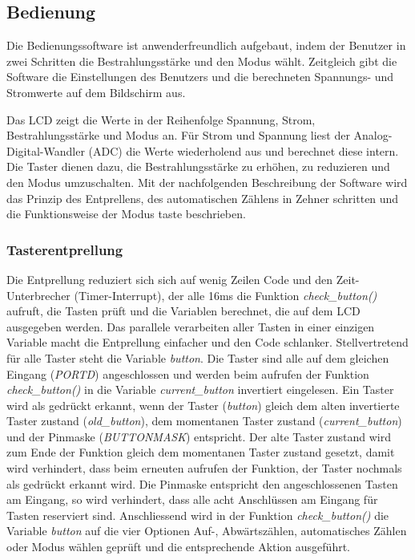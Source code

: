 \subsection{Bedienung}
Die Bedienungssoftware ist anwenderfreundlich aufgebaut, indem der Benutzer in zwei Schritten die Bestrahlungsstärke und den Modus wählt. Zeitgleich gibt die Software die Einstellungen des Benutzers und die berechneten Spannungs- und Stromwerte auf dem Bildschirm aus.

Das LCD zeigt die Werte in der Reihenfolge Spannung, Strom, Bestrahlungsstärke und Modus an. Für Strom und Spannung liest der Analog-Digital-Wandler (ADC) die Werte wiederholend aus und berechnet diese intern. Die Taster dienen dazu, die Bestrahlungsstärke zu erhöhen, zu reduzieren und den Modus umzuschalten. Mit der nachfolgenden Beschreibung der Software wird das Prinzip des Entprellens, des automatischen Zählens in Zehner schritten und die Funktionsweise der Modus taste beschrieben.

\subsubsection{Tasterentprellung}
Die Entprellung reduziert sich sich auf wenig Zeilen Code und den Zeit-Unterbrecher (Timer-Interrupt), der alle 16ms die Funktion \textit{check\_button()} aufruft, die Tasten prüft und die Variablen berechnet, die auf dem LCD ausgegeben werden. Das parallele verarbeiten aller Tasten in einer einzigen Variable macht die Entprellung einfacher und den Code schlanker. Stellvertretend für alle Taster steht die Variable \textit{button}. Die Taster sind alle auf dem gleichen Eingang (\textit{PORTD}) angeschlossen und werden beim aufrufen der Funktion \textit{check\_button()} in die Variable \textit{current\_button} invertiert eingelesen. Ein Taster wird als gedrückt erkannt, wenn der Taster (\textit{button}) gleich dem alten invertierte Taster zustand (\textit{old\_button}), dem momentanen Taster zustand (\textit{current\_button}) und der Pinmaske (\textit{BUTTONMASK}) entspricht. Der alte Taster zustand wird zum Ende der Funktion gleich dem momentanen Taster zustand gesetzt, damit wird verhindert, dass beim erneuten aufrufen der Funktion, der Taster nochmals als gedrückt erkannt wird. Die Pinmaske entspricht den angeschlossenen Tasten am Eingang, so wird verhindert, dass alle acht Anschlüssen am Eingang für Tasten reserviert sind.
Anschliessend wird in der Funktion \textit{check\_button()} die Variable \textit{button} auf die vier Optionen Auf-, Abwärtszählen, automatisches Zählen oder Modus wählen geprüft und die entsprechende Aktion ausgeführt.


